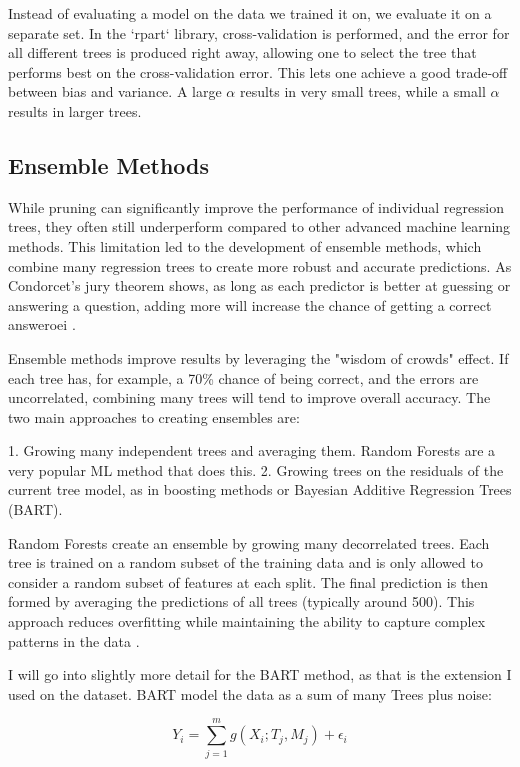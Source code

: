\documentclass[12pt]{article}
\begin{document}
Instead of evaluating a model on the data we trained it on, we evaluate it on a separate set. In the `rpart` library, cross-validation is performed, and the error for all different trees is produced right away, allowing one to select the tree that performs best on the cross-validation error. This lets one achieve a good trade-off between bias and variance. A large $\alpha$ results in very small trees, while a small $\alpha$ results in larger trees.


\subsection{Ensemble Methods}
While pruning can significantly improve the performance of individual regression trees, they often still underperform compared to other advanced machine learning methods. This limitation led to the development of ensemble methods, which combine many regression trees to create more robust and accurate predictions. As Condorcet's jury theorem shows, as long as each predictor is better at guessing or answering a question, adding more will increase the chance of getting a correct answeroei \citep{condorcet1785}.

Ensemble methods improve results by leveraging the "wisdom of crowds" effect. If each tree has, for example, a 70\% chance of being correct, and the errors are uncorrelated, combining many trees will tend to improve overall accuracy. The two main approaches to creating ensembles are:

1. Growing many independent trees and averaging them. Random Forests are a very popular ML method that does this.
2. Growing trees on the residuals of the current tree model, as in boosting methods or Bayesian Additive Regression Trees (BART).

Random Forests create an ensemble by growing many decorrelated trees. Each tree is trained on a random subset of the training data and is only allowed to consider a random subset of features at each split. The final prediction is then formed by averaging the predictions of all trees (typically around 500). This approach reduces overfitting while maintaining the ability to capture complex patterns in the data \citep{biau2016}.

I will go into slightly more detail for the BART method, as that is the extension I used on the dataset. BART model the data as a sum of many Trees plus noise:

\begin{equation}
    Y_i = \sum_{j=1}^{m} g(X_i; T_j, M_j) + \epsilon_i
\end{equation}
\end{document}
